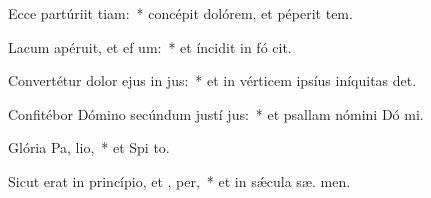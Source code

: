 \item Ecce partúriit tiam:~* concépit dolórem, et péperit tem.
\item Lacum apéruit, et ef um:~* et íncidit in fó  cit.
\item Convertétur dolor ejus in  jus:~* et in vérticem ipsíus iníquitas  det.
\item Confitébor Dómino secúndum justí jus:~* et psallam nómini Dó mi.
\item Glória Pa,  lio,~* et Spi to.
\item Sicut erat in princípio, et ,  per,~* et in sǽcula sæ. men.
